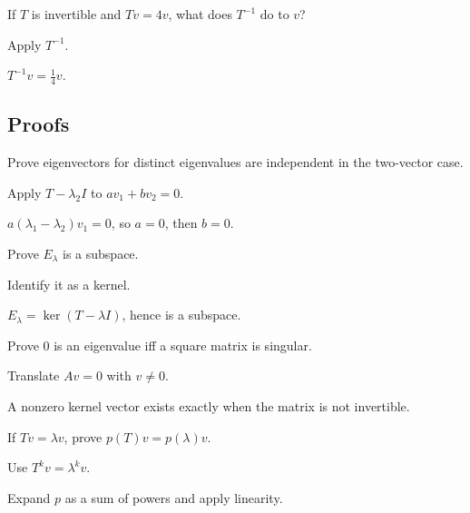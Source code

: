 \begin{exercise}\label{exr:i09-expand-05}
If \(T\) is invertible and \(Tv=4v\), what does \(T^{-1}\) do to \(v\)?
\end{exercise}
\begin{hint}
Apply \(T^{-1}\).
\end{hint}
\begin{solution}
\(T^{-1}v=\frac14v\).
\end{solution}

\subsection*{Proofs}

\begin{exercise}\label{exr:i09-expand-06}
Prove eigenvectors for distinct eigenvalues are independent in the two-vector case.
\end{exercise}
\begin{hint}
Apply \(T-\lambda_2I\) to \(av_1+bv_2=0\).
\end{hint}
\begin{solution}
\(a(\lambda_1-\lambda_2)v_1=0\), so \(a=0\), then \(b=0\).
\end{solution}

\begin{exercise}\label{exr:i09-expand-07}
Prove \(E_\lambda\) is a subspace.
\end{exercise}
\begin{hint}
Identify it as a kernel.
\end{hint}
\begin{solution}
\(E_\lambda=\ker(T-\lambda I)\), hence is a subspace.
\end{solution}

\begin{exercise}\label{exr:i09-expand-08}
Prove \(0\) is an eigenvalue iff a square matrix is singular.
\end{exercise}
\begin{hint}
Translate \(Av=0\) with \(v\neq0\).
\end{hint}
\begin{solution}
A nonzero kernel vector exists exactly when the matrix is not invertible.
\end{solution}

\begin{exercise}\label{exr:i09-expand-09}
If \(Tv=\lambda v\), prove \(p(T)v=p(\lambda)v\).
\end{exercise}
\begin{hint}
Use \(T^kv=\lambda^kv\).
\end{hint}
\begin{solution}
Expand \(p\) as a sum of powers and apply linearity.
\end{solution}

